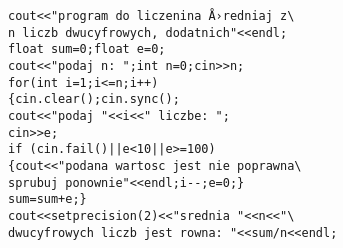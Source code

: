 \begin{verbatim}
cout<<"program do liczenina Å›redniaj z\
n liczb dwucyfrowych, dodatnich"<<endl;
float sum=0;float e=0;
cout<<"podaj n: ";int n=0;cin>>n;
for(int i=1;i<=n;i++)
{cin.clear();cin.sync();
cout<<"podaj "<<i<<" liczbe: ";
cin>>e;
if (cin.fail()||e<10||e>=100)
{cout<<"podana wartosc jest nie poprawna\
sprubuj ponownie"<<endl;i--;e=0;}
sum=sum+e;}
cout<<setprecision(2)<<"srednia "<<n<<"\
dwucyfrowych liczb jest rowna: "<<sum/n<<endl;
\end{verbatim}